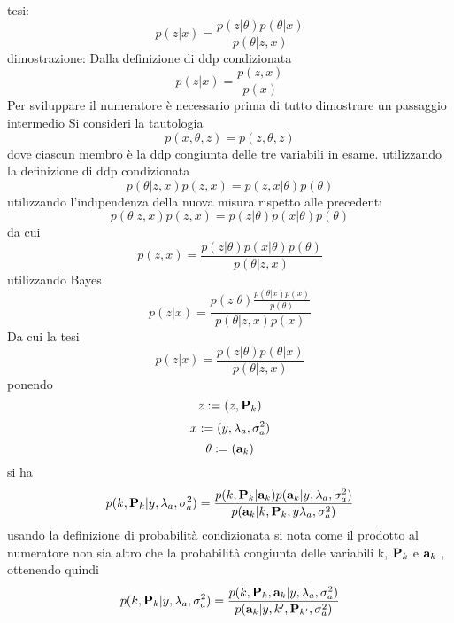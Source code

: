 tesi:
\begin{equation}
p(z|x)=\frac{p(z|\theta)p(\theta|x)}{p(\theta|z,x)}
\end{equation}
dimostrazione: Dalla definizione di ddp condizionata
\begin{equation}
p(z|x)=\frac{p(z,x)}{p(x)}
\end{equation}
Per sviluppare il numeratore è necessario prima di tutto dimostrare un passaggio
intermedio Si consideri la tautologia
\begin{equation}
p(x,\theta,z)=p(z,\theta,z)
\end{equation}
dove ciascun membro è la ddp congiunta delle tre variabili in esame. utilizzando la
definizione di ddp condizionata
\begin{equation}
p(\theta|z, x)p(z, x) = p(z, x|\theta)p(\theta)
\end{equation}
utilizzando l’indipendenza della nuova misura rispetto alle precedenti
\begin{equation}
p(\theta|z, x)p(z, x) = p(z|\theta)p(x|\theta)p(\theta)
\end{equation}
da cui
\begin{equation}
p(z,x)=\frac{p(z|\theta)p(x|\theta)p(\theta)
}{p(\theta|z,x)}
\end{equation}
utilizzando Bayes
\begin{equation}
p(z|x)=\frac{p(z|\theta)\frac{p(\theta|x)p(x)}{p(\theta)}}{p(\theta|z,x)p(x)}
\end{equation}
Da cui la tesi
\begin{equation}
p(z|x)=\frac{p(z|\theta)p(\theta|x)}{p(\theta|z,x)}
\end{equation}
ponendo
\begin{equation}
z:=(z,\textbf{P}_k)
\end{equation}
\begin{equation}
x:=(y,\lambda_a,\sigma_a^2)
\end{equation}
\begin{equation}
\theta:=(\textbf{a}_k)
\end{equation}
si ha
\begin{equation}
p(k,\textbf{P}_k|y,\lambda_a,\sigma_a^2)=\frac{p(k,\textbf{P}_k|\textbf{a}_k)p(\textbf{a}_k|y,\lambda_a,\sigma_a^2)}{p(\textbf{a}_k|k,\textbf{P}_k,y\lambda_a,\sigma_a^2)}
\end{equation}
usando la definizione di probabilità condizionata si nota come il prodotto al numeratore non sia altro che la probabilità congiunta delle variabili k, $\textbf{P}_k$ e $\textbf{a}_k$ , ottenendo
quindi
\begin{equation}
p(k,\textbf{P}_k|y,\lambda_a,\sigma_a^2)=\frac{p(k,\textbf{P}_k,\textbf{a}_k|y,\lambda_a,\sigma_a^2)}{p(\textbf{a}_k|y,k',\textbf{P}_{k'},\sigma_a^2)}
\end{equation}
